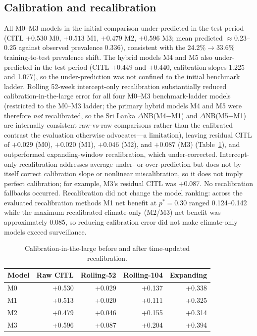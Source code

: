\documentclass[11pt,a4paper]{article}
\begin{document}
\subsection{Calibration and recalibration}
All M0--M3 models in the initial comparison under-predicted in the test period (CITL $+0.530$ M0, $+0.513$ M1, $+0.479$ M2, $+0.596$ M3; mean predicted $\approx$0.23--0.25 against observed prevalence 0.336), consistent with the 24.2\%$\rightarrow$33.6\% training-to-test prevalence shift. The hybrid models M4 and M5 also under-predicted in the test period (CITL $+0.449$ and $+0.440$, calibration slopes 1.225 and 1.077), so the under-prediction was not confined to the initial benchmark ladder. Rolling 52-week intercept-only recalibration substantially reduced calibration-in-the-large error for all four M0--M3 benchmark-ladder models (restricted to the M0--M3 ladder; the primary hybrid models M4 and M5 were therefore \emph{not} recalibrated, so the Sri Lanka $\Delta$NB(M4$-$M1) and $\Delta$NB(M5$-$M1) are internally consistent raw-vs-raw comparisons rather than the calibrated contrast the evaluation otherwise advocates---a limitation), leaving residual CITL of $+0.029$ (M0), $+0.020$ (M1), $+0.046$ (M2), and $+0.087$ (M3) (Table~\ref{tab:recal}), and outperformed expanding-window recalibration, which under-corrected. Intercept-only recalibration addresses average under- or over-prediction but does not by itself correct calibration slope or nonlinear miscalibration, so it does not imply perfect calibration; for example, M3's residual CITL was $+0.087$. No recalibration fallbacks occurred. Recalibration did not change the model ranking: across the evaluated recalibration methods M1 net benefit at $p^*=0.30$ ranged 0.124--0.142 while the maximum recalibrated climate-only (M2/M3) net benefit was approximately 0.085, so reducing calibration error did not make climate-only models exceed surveillance.

\begin{table}[htbp]
\centering
\caption{Calibration-in-the-large before and after time-updated recalibration.}
\label{tab:recal}
\small
\begin{tabular}{lrrrr}
\toprule
Model & Raw CITL & Rolling-52 & Rolling-104 & Expanding \\
\midrule
M0 & +0.530 & +0.029 & +0.137 & +0.338 \\
M1 & +0.513 & +0.020 & +0.111 & +0.325 \\
M2 & +0.479 & +0.046 & +0.155 & +0.314 \\
M3 & +0.596 & +0.087 & +0.204 & +0.394 \\
\bottomrule
\end{tabular}
\end{table}
\end{document}
